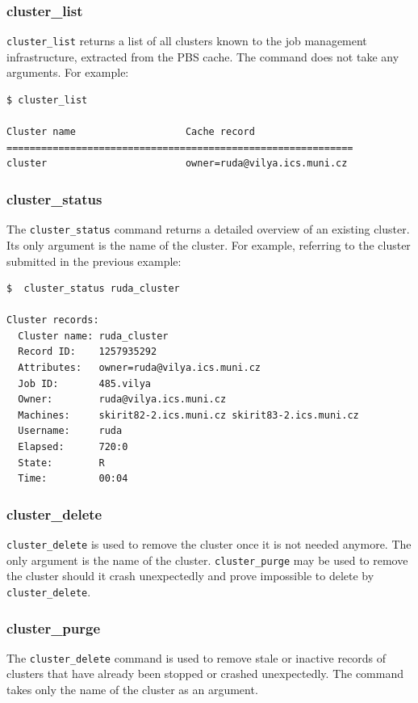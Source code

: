 \documentclass[a4paper]{article}
\begin{document}
\subsubsection{cluster\_list}
\texttt{cluster\_list} returns a list of all clusters known to the job management infrastructure, extracted from the PBS cache. The command does not take any arguments. For example:

\begin{verbatim}
$ cluster_list

Cluster name                   Cache record
============================================================
cluster                        owner=ruda@vilya.ics.muni.cz
\end{verbatim}

\subsubsection{cluster\_status}
The \texttt{cluster\_status} command returns a detailed overview of an existing cluster. Its only argument is the name of the cluster. For example, referring to the cluster submitted in the previous example:

\begin{verbatim}
$  cluster_status ruda_cluster

Cluster records:
  Cluster name: ruda_cluster
  Record ID:    1257935292
  Attributes:   owner=ruda@vilya.ics.muni.cz
  Job ID:       485.vilya
  Owner:        ruda@vilya.ics.muni.cz
  Machines:     skirit82-2.ics.muni.cz skirit83-2.ics.muni.cz 
  Username:     ruda
  Elapsed:      720:0
  State:        R
  Time:         00:04
\end{verbatim}


\subsubsection{cluster\_delete}
\texttt{cluster\_delete} is used to remove the cluster once it is not needed anymore. The only argument is the name of the cluster. \texttt{cluster\_purge} may be used to remove the cluster should it crash unexpectedly and prove impossible to delete by \texttt{cluster\_delete}.

\subsubsection{cluster\_purge}
The \texttt{cluster\_delete} command is used to remove stale or inactive records of clusters that have already been stopped or crashed unexpectedly. The command takes only the name of the cluster as an argument.
\end{document}
